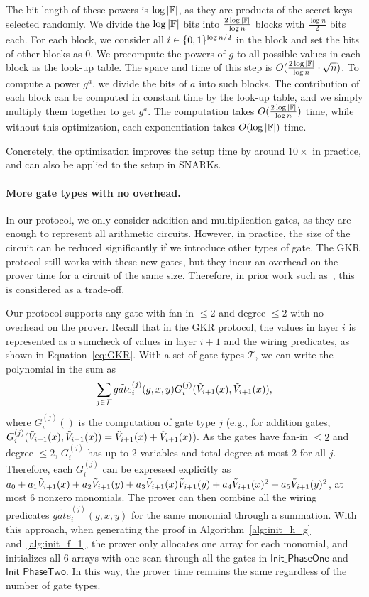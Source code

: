 The bit-length of these powers is $\log |\mathbb{F}|$, as they are products of the secret keys selected randomly. We divide the $\log|\mathbb{F}|$ bits into $\frac{2\log|\mathbb{F}|}{\log n}$ blocks with $\frac{\log n}{2}$ bits each. For each block, we consider all $i\in\{0,1\}^{\log n/2}$ in the block and set the bits of other blocks as 0. We precompute the powers of $g$ to all possible values in each block as the look-up table. The space and time of this step is $O(\frac{2\log|\mathbb{F}|}{\log n}\cdot\sqrt{n})$. To compute a power $g^a$, we divide the bits of $a$ into such blocks. The contribution of each block can be computed in constant time by the look-up table, and we simply multiply them together to get $g^a$. The computation takes $O(\frac{2\log|\mathbb{F}|}{\log n})$ time, while without this optimization, each exponentiation takes $O(\log |\mathbb{F}|)$ time.

Concretely, the optimization improves the setup time by around $10\times$ in practice, and can also be applied to the setup in SNARKs.

\paragraph{More gate types with no overhead.} In our protocol, we only consider addition and multiplication gates, as they are enough to represent all arithmetic circuits. However, in practice, the size of the circuit can be reduced significantly if we introduce other types of gate. The GKR protocol still works with these new gates, but they incur an overhead on the prover time for a circuit of the same size. Therefore, in prior work such as~\cite{wahby2016verifiable,vram}, this is considered as a trade-off.

Our protocol supports any gate with fan-in $\le 2$ and degree $\le 2$ with no overhead on the prover. Recall that in the GKR protocol, the values in layer $i$ is represented as a sumcheck of values in layer $i+1$ and the wiring predicates, as shown in Equation~\ref{eq:GKR}. With a set of gate types $\mathcal{T}$, we can write the polynomial in the sum as $$\sum_{j\in\mathcal{T}}\tilde{gate}^{(j)}_i(g,x,y) G^{(j)}_i(\tilde{V}_{i+1}(x),\tilde{V}_{i+1}(x)),$$ where $G^{(j)}_i()$ is the computation of gate type $j$ (e.g., for addition gates, $G^{(j)}_i(\tilde{V}_{i+1}(x),\tilde{V}_{i+1}(x)) = \tilde{V}_{i+1}(x)+\tilde{V}_{i+1}(x)$). As the gates have fan-in $\le 2$ and degree $\le 2$, $G^{(j)}_i$ has up to 2 variables and total degree at most 2 for all $j$. Therefore, each $G^{(j)}_i$ can be expressed explicitly as $a_0+a_1\tilde{V}_{i+1}(x)+a_2\tilde{V}_{i+1}(y)+a_3\tilde{V}_{i+1}(x)\tilde{V}_{i+1}(y)+a_4\tilde{V}_{i+1}(x)^2+a_5\tilde{V}_{i+1}(y)^2$, at most 6 nonzero monomials. The prover can then combine all the wiring predicates $\tilde{gate}^{(j)}_i(g,x,y)$ for the same monomial through a summation. With this approach, when generating the proof in Algorithm~\ref{alg:init_h_g} and~\ref{alg:init_f_1}, the prover only allocates one array for each monomial, and initializes all 6 arrays with one scan through all the gates in $\mathsf{Init\_PhaseOne}$ and $\mathsf{Init\_PhaseTwo}$. In this way, the prover time remains the same regardless of the number of gate types. 

